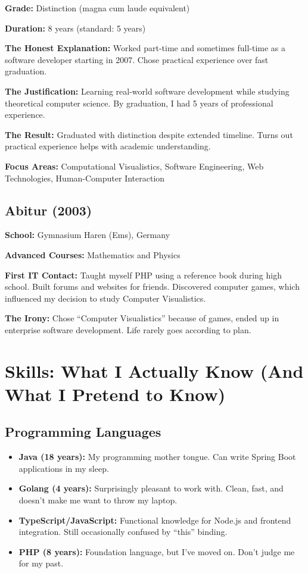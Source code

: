 \documentclass[11pt,a4paper]{article}
\begin{document}
\textbf{Grade:} Distinction (magna cum laude equivalent)

\textbf{Duration:} 8 years (standard: 5 years)

\textbf{The Honest Explanation:} Worked part-time and sometimes full-time as a software developer starting in 2007. Chose practical experience over fast graduation.

\textbf{The Justification:} Learning real-world software development while studying theoretical computer science. By graduation, I had 5 years of professional experience.

\textbf{The Result:} Graduated with distinction despite extended timeline. Turns out practical experience helps with academic understanding.

\textbf{Focus Areas:} Computational Visualistics, Software Engineering, Web Technologies, Human-Computer Interaction

\subsection{Abitur (2003)}
\textbf{School:} Gymnasium Haren (Ems), Germany

\textbf{Advanced Courses:} Mathematics and Physics

\textbf{First IT Contact:} Taught myself PHP using a reference book during high school. Built forums and websites for friends. Discovered computer games, which influenced my decision to study Computer Visualistics.

\textbf{The Irony:} Chose ``Computer Visualistics'' because of games, ended up in enterprise software development. Life rarely goes according to plan.

\section{Skills: What I Actually Know (And What I Pretend to Know)}

\subsection{Programming Languages}
\begin{itemize}
\item \textbf{Java (18 years):} My programming mother tongue. Can write Spring Boot applications in my sleep.
\item \textbf{Golang (4 years):} Surprisingly pleasant to work with. Clean, fast, and doesn't make me want to throw my laptop.
\item \textbf{TypeScript/JavaScript:} Functional knowledge for Node.js and frontend integration. Still occasionally confused by ``this'' binding.
\item \textbf{PHP (8 years):} Foundation language, but I've moved on. Don't judge me for my past.
\end{itemize}
\end{document}
